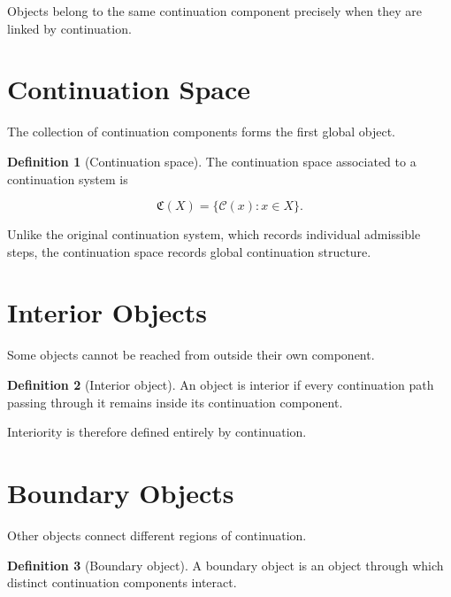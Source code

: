 \documentclass[13pt,openany]{book}
\theoremstyle{plain}
\theoremstyle{definition}
\newtheorem{definition}{Definition}[chapter]
\begin{document}
Objects belong to the same continuation component precisely when they are linked
by continuation.


\section{Continuation Space}

The collection of continuation components forms the first global object.

\begin{definition}[Continuation space]

The continuation space associated to a continuation system is

\[
\mathfrak C(X)
=
\{
\mathcal C(x):
x\in X
\}.
\]

\end{definition}

Unlike the original continuation system, which records individual admissible
steps, the continuation space records global continuation structure.


\section{Interior Objects}

Some objects cannot be reached from outside their own component.

\begin{definition}[Interior object]

An object is interior if every continuation path passing through it remains
inside its continuation component.

\end{definition}

Interiority is therefore defined entirely by continuation.


\section{Boundary Objects}

Other objects connect different regions of continuation.

\begin{definition}[Boundary object]

A boundary object is an object through which distinct continuation components
interact.

\end{definition}
\end{document}
